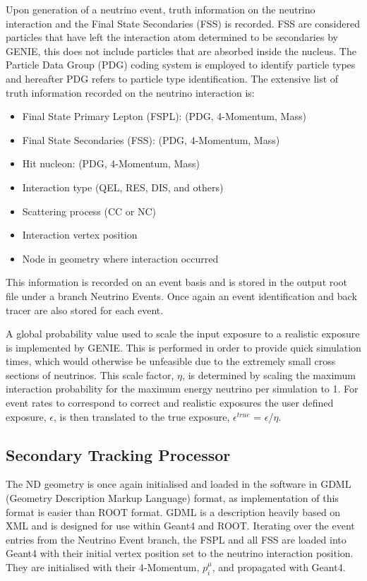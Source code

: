 Upon generation of a neutrino event, truth information on the neutrino interaction and the Final State Secondaries (FSS) is recorded. FSS are considered particles that have left the interaction atom determined to be secondaries by GENIE, this does not include particles that are absorbed inside the nucleus. The Particle Data Group (PDG) \cite{pdgReference} coding system is employed to identify particle types and hereafter PDG refers to particle type identification. The extensive list of truth information recorded on the neutrino interaction is:
\begin{itemize}
	\item Final State Primary Lepton (FSPL): (PDG, 4-Momentum, Mass)
	\item Final State Secondaries (FSS): (PDG, 4-Momentum, Mass)
	\item Hit nucleon: (PDG, 4-Momentum, Mass)
	\item Interaction type (QEL, RES, DIS, and others)
	\item Scattering process (CC or NC)
	\item Interaction vertex position
	\item Node in geometry where interaction occurred
\end{itemize}
This information is recorded on an event basis and is stored in the output root file under a branch Neutrino Events. Once again an event identification and back tracer are also stored for each event.
 
A global probability value used to scale the input exposure to a realistic exposure is implemented by GENIE. This is performed in order to provide quick simulation times, which would otherwise be unfeasible due to the extremely small cross sections of neutrinos. This scale factor, $\eta$, is determined by scaling the maximum interaction probability for the maximum energy neutrino per simulation to 1. For event rates to correspond to correct and realistic exposures the user defined exposure, $\epsilon$, is then translated to the true exposure, $\epsilon^{true}$ = $\epsilon$/$\eta$.

\subsection{Secondary Tracking Processor}
The ND geometry is once again initialised and loaded in the software in GDML (Geometry Description Markup Language)\cite{GDML} format, as implementation of this format is easier than ROOT format. GDML is a description heavily based on XML and is designed for use within Geant4 and ROOT. Iterating over the event entries from the Neutrino Event branch, the FSPL and all FSS are loaded into Geant4 with their initial vertex position set to the neutrino interaction position. They are initialised with their 4-Momentum, $p^{\mu}_{i}$, and propagated with Geant4. 

